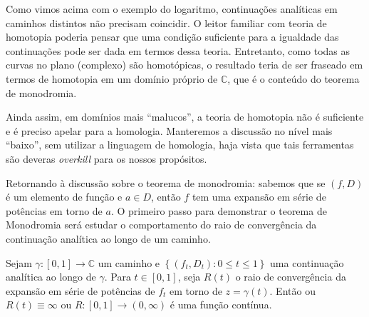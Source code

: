 Como vimos acima com o exemplo do logaritmo, continuações analíticas em 
caminhos distintos não precisam coincidir. O leitor familiar com teoria de
homotopia poderia pensar que uma condição suficiente para a
igualdade das continuações pode ser dada em termos dessa teoria. Entretanto,
como todas as curvas no plano (complexo) são homotópicas, o resultado teria
de ser fraseado em termos de homotopia em um domínio próprio de $\mathbb{C}$,
que é o conteúdo do teorema de monodromia.

Ainda assim, em domínios mais ``malucos'', a teoria de homotopia não é suficiente
e é preciso apelar para a homologia. Manteremos a discussão no nível mais ``baixo'',
sem utilizar a linguagem de homologia, haja vista que tais
ferramentas são deveras \textit{overkill} para os nossos propósitos.

Retornando à discussão sobre o teorema de monodromia: sabemos que se $(f,D)$ é
um elemento de função e $a\in D$, então $f$ tem uma expansão em série de potências
em torno de $a$. O primeiro passo para demonstrar o teorema de Monodromia será
estudar o comportamento do raio de convergência da continuação analítica ao longo
de um caminho.

\begin{lema}
\label{lema-raio-convergencia-continuo}
Sejam $\gamma: [0,1]\to\mathbb{C}$ um caminho e 
$\left\{ (f_t, D_t): 0\leq t\leq 1 \right\}$ uma continuação analítica ao longo de
$\gamma$. Para $t\in[0,1]$, seja $R(t)$ o raio de convergência da expansão em 
série de potências de $f_t$ em torno de $z=\gamma(t)$. Então ou $R(t) \equiv\infty$
ou $R: [0,1]\to (0, \infty)$ é uma função contínua.
\end{lema}

